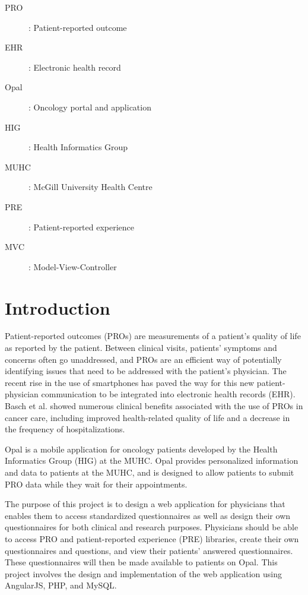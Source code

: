\documentclass{higrep}
\begin{document}
\begin{description}
\item [PRO]: Patient-reported outcome
\item [EHR]: Electronic health record
\item [Opal]: Oncology portal and application
\item [HIG]: Health Informatics Group
\item [MUHC]: McGill University Health Centre
\item [PRE]: Patient-reported experience
\item [MVC]: Model-View-Controller

\end{description}


\mainmatter

\chapter{Introduction}

Patient-reported outcomes (PROs) are measurements of a patient's quality of life as reported by the patient. Between clinical visits, patients' symptoms and concerns often go unaddressed, and PROs are an efficient way of potentially identifying issues that need to be addressed with the patient's physician. The recent rise in the use of smartphones has paved the way for this new patient-physician communication to be integrated into electronic health records (EHR). Basch et al. showed numerous clinical benefits associated with the use of PROs in cancer care, including improved health-related quality of life and a decrease in the frequency of hospitalizations\cite{basch16}.

Opal is a mobile application for oncology patients developed by the Health Informatics Group (HIG) at the MUHC. Opal provides personalized information and data to patients at the MUHC, and is designed to allow patients to submit PRO data while they wait for their appointments.

The purpose of this project is to design a web application for physicians that enables them to access standardized questionnaires as well as design their own questionnaires for both clinical and research purposes. Physicians should be able to access PRO and patient-reported experience (PRE) libraries, create their own questionnaires and questions, and view their patients' answered questionnaires. These questionnaires will then be made available to patients on Opal. This project involves the design and implementation of the web application using AngularJS, PHP, and MySQL.
\end{document}
